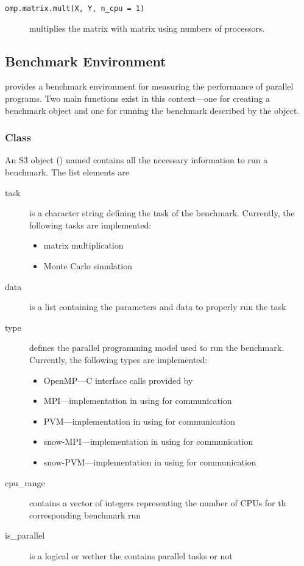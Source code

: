 \begin{description}
\item[\texttt{omp.matrix.mult(X, Y, n\_cpu = 1)}] multiplies the matrix
   with matrix  using  numbers of
  processors.
\end{description}

\subsection{Benchmark Environment}

 provides a benchmark environment for measuring the
performance of parallel programs. Two main functions exist in this
context---one for creating a benchmark object and one for running the
benchmark described by the object.

\subsubsection{Class }

An S3 object (\cite{chambers91sms}) named  contains all
the necessary information to run a benchmark. The list elements are

\begin{description}
\item[task] is a character string defining the task of the
  benchmark. Currently, the 
  following tasks are implemented:
  \begin{itemize}
  \item matrix multiplication
  \item Monte Carlo simulation
  \end{itemize}
\item[data] is a list containing the parameters and data to properly
  run the task
\item[type]defines the parallel programming model used to run the
  benchmark. Currently, the following types are implemented:
  \begin{itemize}
  \item OpenMP---C interface calls provided by 
  \item MPI---implementation in  using  for
    communication
  \item PVM---implementation in  using  for
    communication 
  \item snow-MPI---implementation in  using  for
    communication
  \item snow-PVM---implementation in  using  for
    communication
  \end{itemize}
\item[cpu\_range] contains a vector of integers representing the number
  of CPUs for th corresponding benchmark run 
\item[is\_parallel] is a logical  or  wether the
  contains parallel tasks or not
\end{description}


